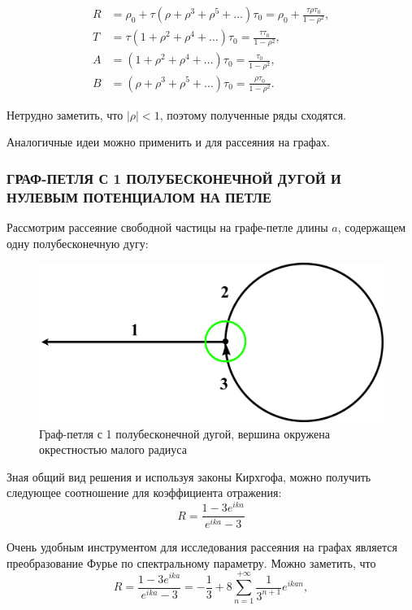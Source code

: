 \documentclass[a4 paper, 12 pt]{extarticle}
\begin{document}
   \[
   \begin{aligned}
   R&=\rho_0+\tau(\rho+\rho^3+\rho^5+\ldots)\tau_0=\rho_0+\frac{\tau\rho\tau_0}{1-\rho^2},\\
   T&=\tau(1+\rho^2+\rho^4+\ldots)\tau_0=\frac{\tau\tau_0}{1-\rho^2}, \\
   A&=(1+\rho^2+\rho^4+\ldots)\tau_0=\frac{\tau_0}{1-\rho^2}, \\
   B&=(\rho+\rho^3+\rho^5+\ldots)\tau_0=\frac{\rho\tau_0}{1-\rho^2}.   
   \end{aligned}\]
   
   Нетрудно заметить, что $|\rho|<1$, поэтому полученные ряды сходятся.   
   
   Аналогичные идеи можно применить и для рассеяния на графах.
   
   \subsubsection{ГРАФ-ПЕТЛЯ С 1 ПОЛУБЕСКОНЕЧНОЙ ДУГОЙ И НУЛЕВЫМ ПОТЕНЦИАЛОМ НА ПЕТЛЕ}
   
   Рассмотрим рассеяние свободной частицы на графе-петле длины $a$, содержащем одну полубесконечную дугу:
   
   \begin{figure}[!htb]
   	\centering
   	\includegraphics[scale=0.05]{circle1.jpg}
    \caption{Граф-петля с 1 полубесконечной дугой, вершина окружена окрестностью малого радиуса}
   \end{figure}
   
   Зная общий вид решения и используя законы Кирхгофа, можно получить следующее соотношение для коэффициента отражения:
   \begin{equation}
   \label{multiplyReflection1}
   R = \frac{1-3e^{ika}}{e^{ika}-3}
   \end{equation}
   
   Очень удобным инструментом для исследования рассеяния на графах является преобразование Фурье по спектральному параметру.
   Можно заметить, что \[  R = \frac{1-3e^{ika}}{e^{ika}-3} = -\frac{1}{3} + 8 \sum_{n=1}^{+\infty}\frac{1}{3^{n+1}}e^{ikan},\]
   
\end{document}
